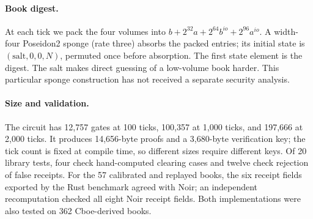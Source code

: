 \paragraph{Book digest.} At each tick we pack the four volumes into \(b+2^{32}a+2^{64}b^{io}+2^{96}a^{io}\). A width-four Poseidon2 sponge (rate three) absorbs the packed entries; its initial state is \((\mathrm{salt},0,0,N)\), permuted once before absorption. The first state element is the digest. The salt makes direct guessing of a low-volume book harder. This particular sponge construction has not received a separate security analysis.

\paragraph{Size and validation.} The circuit has 12,757 gates at 100 ticks, 100,357 at 1,000 ticks, and 197,666 at 2,000 ticks. It produces 14,656-byte proofs and a 3,680-byte verification key; the tick count is fixed at compile time, so different sizes require different keys. Of 20 library tests, four check hand-computed clearing cases and twelve check rejection of false receipts. For the 57 calibrated and replayed books, the six receipt fields exported by the Rust benchmark agreed with Noir; an independent recomputation checked all eight Noir receipt fields. Both implementations were also tested on 362 Cboe-derived books.
